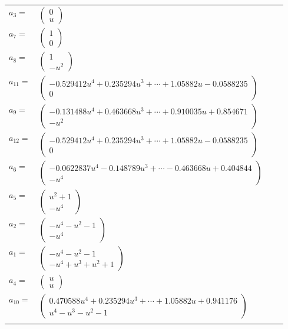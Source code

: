 \documentclass[1p]{elsarticle_modified}
\theoremstyle{definition}
\begin{document}
\begin{tabular}{m{7pt} m{180pt} m{7pt} m{180pt} }
\flushright $a_{3}=$&$\begin{pmatrix}0\\u\end{pmatrix}$ \\
\flushright $a_{7}=$&$\begin{pmatrix}1\\0\end{pmatrix}$ \\
\flushright $a_{8}=$&$\begin{pmatrix}1\\- u^2\end{pmatrix}$ \\
\flushright $a_{11}=$&$\begin{pmatrix}-0.529412 u^{4}+0.235294 u^{3}+\cdots+1.05882 u-0.0588235\\0\end{pmatrix}$ \\
\flushright $a_{9}=$&$\begin{pmatrix}-0.131488 u^{4}+0.463668 u^{3}+\cdots+0.910035 u+0.854671\\- u^2\end{pmatrix}$ \\
\flushright $a_{12}=$&$\begin{pmatrix}-0.529412 u^{4}+0.235294 u^{3}+\cdots+1.05882 u-0.0588235\\0\end{pmatrix}$ \\
\flushright $a_{6}=$&$\begin{pmatrix}-0.0622837 u^{4}-0.148789 u^{3}+\cdots-0.463668 u+0.404844\\- u^4\end{pmatrix}$ \\
\flushright $a_{5}=$&$\begin{pmatrix}u^2+1\\- u^4\end{pmatrix}$ \\
\flushright $a_{2}=$&$\begin{pmatrix}- u^4- u^2-1\\- u^4\end{pmatrix}$ \\
\flushright $a_{1}=$&$\begin{pmatrix}- u^4- u^2-1\\- u^4+u^3+u^2+1\end{pmatrix}$ \\
\flushright $a_{4}=$&$\begin{pmatrix}u\\u\end{pmatrix}$ \\
\flushright $a_{10}=$&$\begin{pmatrix}0.470588 u^{4}+0.235294 u^{3}+\cdots+1.05882 u+0.941176\\u^4- u^3- u^2-1\end{pmatrix}$\\&\end{tabular}
\end{document}
